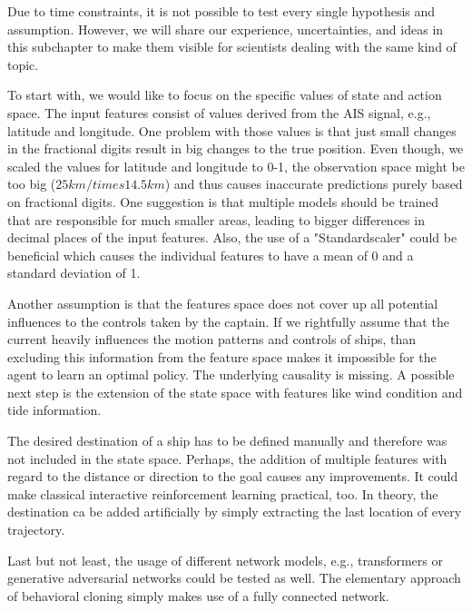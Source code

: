 Due to time constraints, it is not possible to test every single hypothesis and assumption. However, we will share our experience, uncertainties, and ideas in this subchapter to make them visible for scientists dealing with the same kind of topic.
\par
To start with, we would like to focus on the specific values of state and action space. The input features consist of values derived from the AIS signal, e.g., latitude and longitude. One problem with those values is that just small changes in the fractional digits result in big changes to the true position. Even though, we scaled the values for latitude and longitude to 0-1, the observation space might be too big ($25km /times 14.5km$) and thus causes inaccurate predictions purely based on fractional digits. One suggestion is that multiple models should be trained that are responsible for much smaller areas, leading to bigger differences in decimal places of the input features. Also, the use of a "Standardscaler" could be beneficial which causes the individual features to have a mean of 0 and a standard deviation of 1.
\par
Another assumption is that the features space does not cover up all potential influences to the controls taken by the captain. If we rightfully assume that the current heavily influences the motion patterns and controls of ships, than excluding this information from the feature space makes it impossible for the agent to learn an optimal policy. The underlying causality is missing. A possible next step is the extension of the state space with features like wind condition and tide information.
\par
The desired destination of a ship has to be defined manually and therefore was not included in the state space. Perhaps, the addition of multiple features with regard to the distance or direction to the goal causes any improvements. It could make classical interactive reinforcement learning practical, too. In theory, the destination ca be added artificially by simply extracting the last location of every trajectory.
\par
Last but not least, the usage of different network models, e.g., transformers or generative adversarial networks could be tested as well. The elementary approach of behavioral cloning simply makes use of a fully connected network.